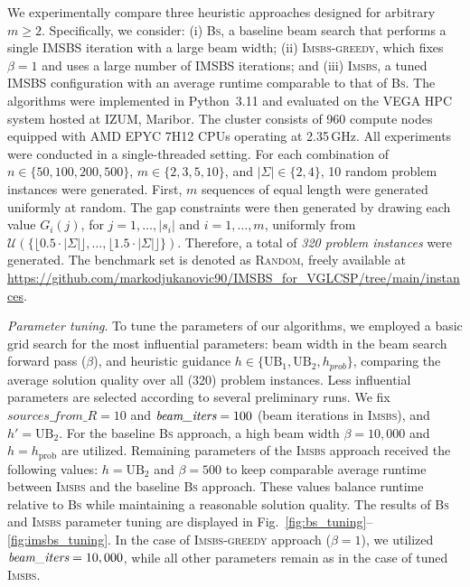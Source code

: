 \documentclass[runningheads]{llncs}
\begin{document}
	We experimentally compare three heuristic approaches designed for arbitrary \(m \geq 2\). Specifically, we consider: (i) \textsc{Bs}, a baseline beam search that performs a single IMSBS iteration with a large beam width; (ii) \textsc{Imsbs-greedy}, which fixes \(\beta=1\) and uses a large number of IMSBS iterations; and (iii) \textsc{Imsbs}, a tuned IMSBS configuration with an average runtime comparable to that of \textsc{Bs}.	 The algorithms were implemented in Python~3.11 and evaluated on the VEGA HPC system hosted at IZUM, Maribor. The cluster consists of 960 compute nodes equipped with AMD EPYC 7H12 CPUs operating at 2.35\,GHz. All experiments were conducted in a single-threaded setting.  For each combination of  $n \in \{50, 100, 200, 500\}$, $m \in \{2, 3, 5, 10\}$, and $|\Sigma| \in \{2, 4\}$, 10 random problem instances were generated. First, $m$ sequences of equal length were generated uniformly at random. The gap constraints were then generated by drawing each value $G_i(j)$, for $j=1, \ldots, |s_i|$ and $i=1, \ldots, m$, uniformly from 
	$\mathcal{U}(\{ \lfloor 0.5 \cdot |\Sigma| \rfloor, \ldots, \lfloor 1.5 \cdot |\Sigma| \rfloor \})$.  Therefore, a total of \textit{320 problem instances} were generated. The benchmark set is denoted as \textsc{Random}, freely available at   
	\url{https://github.com/markodjukanovic90/IMSBS_for_VGLCSP/tree/main/instances}.
	
	\textit{Parameter tuning}. 
	To tune the parameters of our algorithms, 
	we employed a basic grid search for the most influential parameters: beam width in the beam search forward pass ($\beta$), and heuristic guidance  $h \in \{\text{UB}_1, \text{UB}_2, h_{prob}\}$, comparing the average solution quality over all (320) problem instances.  Less influential parameters are selected according to several preliminary runs.  %
	We fix ${{sources\_from\_R}} = 10$ and $\emph{beam\_iters} = 100$ (beam iterations in \textsc{Imsbs}), and %
	$h' = \textrm{UB}_2$.   For the baseline \textsc{Bs} approach, a high beam width $\beta = 10,000$ and $h = h_{\text{prob}}$ are utilized. %
	Remaining parameters of the \textsc{Imsbs} approach received the following values: $h=\text{UB}_2$ and $\beta=500$ to keep comparable average runtime between \textsc{Imsbs} and the baseline \textsc{Bs} approach. These values balance runtime relative to \textsc{Bs} while maintaining a reasonable solution quality. The results of \textsc{Bs} and \textsc{Imsbs} parameter tuning are displayed in Fig.~\ref{fig:bs_tuning}--\ref{fig:imsbs_tuning}.   
	In the case of \textsc{Imsbs-greedy} approach ($\beta = 1$), we utilized  $\emph{beam\_iters} = 10,000$, while all other parameters remain as in the case of tuned \textsc{Imsbs}. 
	
\end{document}
